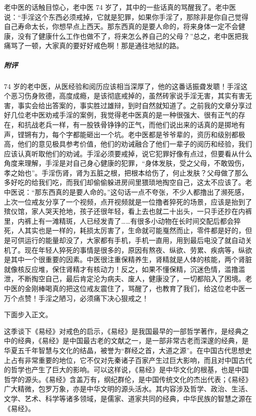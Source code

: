 \begin{case}
    老中医的话触目惊心，老中医 74 岁了，其中的一些话真的骂醒我了。老中医说：“手淫这个东西必须戒掉，它就是犯罪，如果你手淫了，那除非是你自己觉得自己寿命太长，你想早点上西天。那东西真的是要人命的，将来身体一定不会健康，没有了健康什么工作也做不了，将来怎么养自己的父母？”总之，老中医把我痛骂了一顿，大家真的要好好戒色啊！那是通往地狱的路。
    \subparagraph{附评} 74 岁的老中医，从医经验和阅历应该相当深厚了，他的这番话振聋发聩！手淫这个恶习伤身败德，高度成瘾，是该彻底戒掉的，虽然砖家说手淫无害，其实有害无害，事实会给出答案的，事实胜过雄辩，到时自然就知道了。之前我的文章分享过好几位老中医劝戒手淫的案例，我觉得老中医真的是一种很强大、很有正气的存在，和抗战老兵一样，有一股铁骨铮铮的正气，而他们说出来的话真的是掷地有声，铿锵有力，每个字都能砸出一个坑。老中医都是爷爷辈的，资历和级别都极高，他们的意见极具参考价值，他们的劝诫融合了他们一辈子的阅历和经验，我们应该认真听取他们的劝诫。手淫必须要戒掉，说它犯罪好像有点过，但要看从什么角度来理解，手淫是对自己身心健康的犯罪，“身体发肤，受之父母，不敢毁伤，孝之始也”。手淫伤肾，肾为五脏之根，把根本给伤了，何止发肤？父母做了那么多好吃的给我们吃，而我们却偷偷躲进房间里猥琐地掏空自己，这太不应该了。老中医说：“那东西真的是要人命的。”这句话一点不夸张，不少人都撸出了濒死感，上次一位戒友分享了一个视频，点开视频就是一位撸者猝死的场景，应该是抬到了殡仪馆，家人哭天抢地，孩子还很年轻，看上去也就二十出头，一只手还抄在内裤里，内裤上有一滩精斑，人已经发青了……有很多小动物在长时间交配后都会猝死，人其实也是一样的，耗损太厉害了，生命就可能戛然而止，零件都是好的，但是可供运行的能量却没了，大家都有手机，手机一直用，用到最后电没了就自动关机了。现在年轻人猝死的事情是很多的，原因有熬夜、纵欲、劳累、疾病等，纵欲是其中一个很重要的因素。中医很注重保精养生，肾精就是人体的核能，两个肾脏就像核反应堆，保住肾精才有核动力！反之，如果不懂保精，沉迷色情，滥撸滥泄，不断掏空自己，最后肯定沦为病夫、废人，健康没了，一切都陷入了困境。老中医的金刚棒喝真的把这位戒友震住了，骂醒了，也教育了我们，给这位老中医一万个点赞！手淫之陋习，必须痛下决心狠戒之！
\end{case}

下面步入正文。

这季谈下《易经》对戒色的启示，《易经》是我国最早的一部哲学著作，是经典之中的经典，《易经》是中国最古老的文献之一，是一部非常古老而深邃的经典，是华夏五千年智慧与文化的结晶，被誉为“群经之首，大道之源”。在中国古代思想史上占有非常重要的地位，它不仅对先秦诸子百家产生过巨大影响，而且对中国古代的哲学也产生了巨大的影响。可以这样说，《易经》是中华文化的根基，也是中国哲学的源头。《易经》含盖万有，纲纪群伦，是中国传统文化的杰出代表；《易经》广大精微，包罗万象，亦是中华文明的源头活水。其内容涉及哲学、政治、生活、文学、艺术、科学等诸多领域，是儒家、道家共同的经典，中华民族的智慧之源在《易经》。

